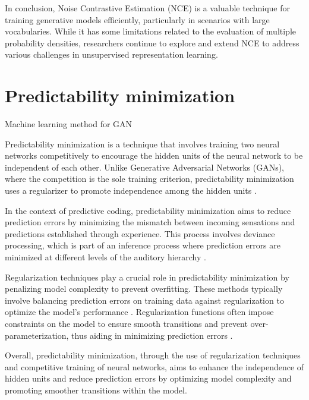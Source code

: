 In conclusion, Noise Contrastive Estimation (NCE) is a valuable technique for training generative models efficiently, particularly in scenarios with large vocabularies. While it has some limitations related to the evaluation of multiple probability densities, researchers continue to explore and extend NCE to address various challenges in unsupervised representation learning.


\section*{Predictability minimization}

Machine learning method for GAN



Predictability minimization is a technique that involves training two neural networks competitively to encourage the hidden units of the neural network to be independent of each other. Unlike Generative Adversarial Networks (GANs), where the competition is the sole training criterion, predictability minimization uses a regularizer to promote independence among the hidden units \citep{10.1145/2640087.2644155}.

In the context of predictive coding, predictability minimization aims to reduce prediction errors by minimizing the mismatch between incoming sensations and predictions established through experience. This process involves deviance processing, which is part of an inference process where prediction errors are minimized at different levels of the auditory hierarchy \citep{10.3389/fnhum.2015.00505}.

Regularization techniques play a crucial role in predictability minimization by penalizing model complexity to prevent overfitting. These methods typically involve balancing prediction errors on training data against regularization to optimize the model's performance \citep{10.1186/1471-2105-16-s16-s2}. Regularization functions often impose constraints on the model to ensure smooth transitions and prevent over-parameterization, thus aiding in minimizing prediction errors \citep{10.1007/978-1-4615-5339-7_102}.

Overall, predictability minimization, through the use of regularization techniques and competitive training of neural networks, aims to enhance the independence of hidden units and reduce prediction errors by optimizing model complexity and promoting smoother transitions within the model.


